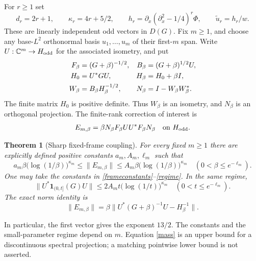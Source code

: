 \documentclass[11pt]{article}
\newtheorem{theorem}{Theorem}[section]
\theoremstyle{remark}
\newcommand{\C}{\mathbb C}
\begin{document}
For \(r\ge1\) set
\begin{equation}\label{jets}
 d_r=2r+1,\qquad \kappa_r=4r+5/2,\qquad
 h_r=\partial_x(\partial_x^2-1/4)^r\Phi,\qquad
 \widetilde u_r=h_r/w.
\end{equation}
These are linearly independent odd vectors in \(D(G)\).
Fix \(m\ge1\), and choose any base-\(L^2\) orthonormal basis
\(u_1,\ldots,u_m\) of their first-\(m\) span. Write
\(U:\C^m\to H_{\rm odd}\) for the associated isometry, and put
\begin{align}
 F_\beta&=(G+\beta)^{-1/2},&
 B_\beta&=(G+\beta)^{1/2}U,\notag\\
 H_0&=U^*GU,& H_\beta&=H_0+\beta I,\notag\\
 W_\beta&=B_\beta H_\beta^{-1/2},&
 N_\beta&=I-W_\beta W_\beta^*.\label{frame}
\end{align}
The finite matrix \(H_0\) is positive definite. Thus \(W_\beta\)
is an isometry, and \(N_\beta\) is an orthogonal projection.
The finite-rank correction of interest is
\begin{equation}\label{E}
 E_{m,\beta}=\beta N_\beta F_\beta UU^*F_\beta N_\beta
                 \quad\text{on }H_{\rm odd}.
\end{equation}

\begin{theorem}[Sharp fixed-frame coupling]\label{main}
For every fixed \(m\ge1\) there are explicitly defined positive
constants \(a_m,A_m,\ell_m\) such that
\begin{equation}\label{mainbound}
 a_m\beta\bigl(\log(1/\beta)\bigr)^{\kappa_m}
 \le \|E_{m,\beta}\|
 \le A_m\beta\bigl(\log(1/\beta)\bigr)^{\kappa_m}
       \quad(0<\beta\le e^{-\ell_m}).
\end{equation}
One may take the constants in \eqref{frameconstants}--\eqref{regime}.
In the same regime,
\begin{equation}\label{mass}
 \|U^*\mathbf1_{(0,t]}(G)U\|
      \le 2A_m t\bigl(\log(1/t)\bigr)^{\kappa_m}
           \quad(0<t\le e^{-\ell_m}).
\end{equation}
The exact norm identity is
\begin{equation}\label{Enorm}
 \|E_{m,\beta}\|
   =\beta\|U^*(G+\beta)^{-1}U-H_\beta^{-1}\|.
\end{equation}
\end{theorem}

In particular, the first vector gives the exponent \(13/2\).
The constants and the small-parameter regime depend on \(m\).
Equation \eqref{mass} is an upper bound for a discontinuous spectral
projection; a matching pointwise lower bound is not asserted.
\end{document}
